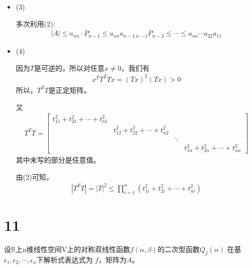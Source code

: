 \documentclass{article}
\begin{document}
\begin{itemize}
  \item (3)

        多次利用(2):
        \begin{align*}
          |A| \leq a_{nn} \cdot P_{n - 1} \leq a_{nn}  a_{n-1 \  n-1} P_{n - 2} \leq \cdots \leq a_{nn} \cdots a_{22} a_{11}
        \end{align*}

  \item (4)

        因为$T$是可逆的，所以对任意$x \neq 0$，我们有
        \begin{align*}
          x^T T^T T x = (Tx)^2 (T x) > 0
        \end{align*}
        所以，$T^T T$是正定矩阵。

        又
        \begin{align*}
          T^T T = \begin{bmatrix}
                    t_{11}^2 + t_{21}^2 + \cdots + t_{n1}^2 &                                                                                            \\
                                                            & t_{12}^2 + t_{22}^2 + \cdots + t_{n2}^2 &                                                  \\
                                                            &                                         & \ddots                                           \\
                                                            &                                         &        & t_{1n}^2 + t_{2n}^2 + \cdots + t_{nn}^2
                  \end{bmatrix}
        \end{align*}
        其中未写的部分是任意值。

        由(2)可知，
        \begin{align*}
          |T^T T| = |T|^2 \leq \prod\limits_{i = 1}^n (t_{1i}^2 + t_{2i}^2 + \cdots + t_{ni}^2)
        \end{align*}
\end{itemize}

\section*{11}

设$\mathbb{R}$上n维线性空间V上的对称双线性函数$f(\alpha, \beta)$的二次型函数$Q_f(\alpha)$
在基$\epsilon_1, \epsilon_2, \cdots, \epsilon_n$下解析式表达式为
$f$，矩阵为$A$。
\end{document}
